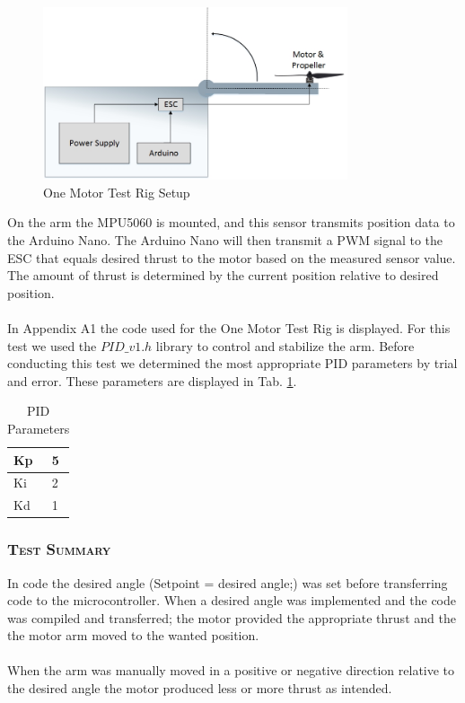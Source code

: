 \begin{figure}[H]
    \centering
    \includegraphics[width = 0.8\textwidth]{VAPIQ-PICTURES/TestSetup1}
    \caption{One Motor Test Rig Setup}
    \label{fig:onemotor}
\end{figure}

\noindent On the arm the MPU5060 is mounted, and this sensor transmits position data to the Arduino Nano. The Arduino Nano will then transmit a PWM signal to the ESC that equals desired thrust to the motor based on the measured sensor value. The amount of thrust is determined by the current position relative to desired position. 
\\\\
In Appendix A1 the code used for the One Motor Test Rig is displayed. For this test we used the $PID\_v1.h$ library to control and stabilize the arm. Before conducting this test we determined the most appropriate PID parameters by trial and error. These parameters are displayed in Tab. \ref{tab:tab2}.
\begin {table}[H]
    \begin{center}
    \caption {PID Parameters} 
    \label{tab:tab2} 
    \begin{tabular}{|l|l|}\hline 
        Kp         & 5  \\ \hline
        Ki         & 2   \\ \hline
        Kd         & 1  \\ \hline
    \end{tabular}
    \end{center}
\end{table}

\subsubsection*{\textsc{\medium Test Summary}}
\noindent
In code the desired angle (Setpoint = desired angle;) was set before transferring code to the microcontroller. When a desired angle was implemented and the code was compiled and transferred; the motor provided the appropriate thrust and the the motor arm moved to the wanted position. 
\\\\
When the arm was manually moved in a positive or negative direction relative to the desired angle the motor produced less or more thrust as intended.


